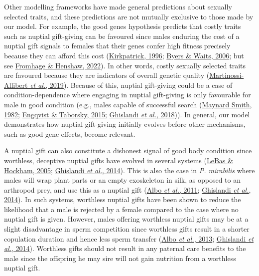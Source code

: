 \documentclass[
]{article}
\begin{document}
Other modelling frameworks have made general predictions about sexually
selected traits, and these predictions are not mutually exclusive to
those made by our model. For example, the good genes hypothesis predicts
that costly traits such as nuptial gift-giving can be favoured since
males enduring the cost of a nuptial gift signals to females that their
genes confer high fitness precisely because they can afford this cost
(\protect\hyperlink{ref-Kirkpatrick1996}{Kirkpatrick, 1996};
\protect\hyperlink{ref-Byers2006}{Byers \& Waits, 2006}; but see
\protect\hyperlink{ref-Fromhage2022}{Fromhage \& Henshaw, 2022}). In
other words, costly sexually selected traits are favoured because they
are indicators of overall genetic quality
(\protect\hyperlink{ref-Martinossi-Allibert2019}{Martinossi-Allibert
\emph{et al.}, 2019}). Because of this, nuptial gift-giving could be a
case of condition-dependence where engaging in nuptial gift-giving is
only favourable for male in good condition (e.g., males capable of
successful search (\protect\hyperlink{ref-MaynardSmith1982}{Maynard
Smith, 1982}; \protect\hyperlink{ref-Engqvist2015}{Engqvist \& Taborsky,
2015}; \protect\hyperlink{ref-Ghislandi2018}{Ghislandi \emph{et al.},
2018})). In general, our model demonstrates how nuptial gift-giving
initially evolves before other mechanisms, such as good gene effects,
become relevant.

A nuptial gift can also constitute a dishonest signal of good body
condition since worthless, deceptive nuptial gifts have evolved in
several systems (\protect\hyperlink{ref-LeBas2005}{LeBas \& Hockham,
2005}; \protect\hyperlink{ref-Ghislandi2014}{Ghislandi \emph{et al.},
2014}). This is also the case in \emph{P. mirabilis} where males will
wrap plant parts or an empty exoskeleton in silk, as opposed to an
arthropod prey, and use this as a nuptial gift
(\protect\hyperlink{ref-Albo2011}{Albo \emph{et al.}, 2011};
\protect\hyperlink{ref-Ghislandi2014}{Ghislandi \emph{et al.}, 2014}).
In such systems, worthless nuptial gifts have been shown to reduce the
likelihood that a male is rejected by a female compared to the case
where no nuptial gift is given. However, males offering worthless
nuptial gifts may be at a slight disadvantage in sperm competition since
worthless gifts result in a shorter copulation duration and hence less
sperm transfer (\protect\hyperlink{ref-Albo2013}{Albo \emph{et al.},
2013}; \protect\hyperlink{ref-Ghislandi2014}{Ghislandi \emph{et al.},
2014}). Worthless gifts should not result in any paternal care benefits
to the male since the offspring he may sire will not gain nutrition from
a worthless nuptial gift.
\end{document}
